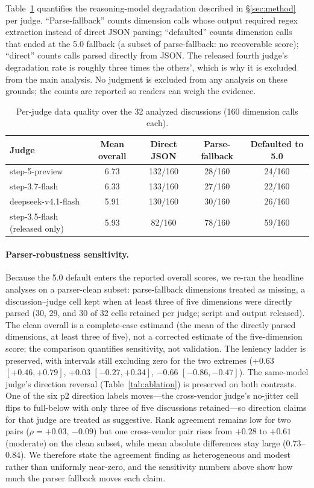 Table~\ref{tab:quality} quantifies the reasoning-model degradation
described in \S\ref{sec:method} per judge. ``Parse-fallback'' counts
dimension calls whose output required regex extraction instead of
direct JSON parsing; ``defaulted'' counts dimension calls that ended at
the 5.0 fallback (a subset of parse-fallback: no recoverable score);
``direct'' counts calls parsed directly from JSON. The released fourth
judge's degradation rate is roughly three times the others', which is
why it is excluded from the main analysis. No judgment is excluded from
any analysis on these grounds; the counts are reported so readers can
weigh the evidence.

\begin{table}[h]
\centering
\caption{Per-judge data quality over the 32 analyzed discussions
(160 dimension calls each).}
\label{tab:quality}
\small
\begin{tabular}{@{}lcccc@{}}
\toprule
Judge & Mean overall & Direct JSON & Parse-fallback & Defaulted to 5.0 \\
\midrule
step-5-preview & 6.73 & 132/160 & 28/160 & 24/160 \\
step-3.7-flash & 6.33 & 133/160 & 27/160 & 22/160 \\
deepseek-v4.1-flash & 5.91 & 130/160 & 30/160 & 26/160 \\
step-3.5-flash (released only) & 5.93 & 82/160 & 78/160 & 59/160 \\
\bottomrule
\end{tabular}
\end{table}

\paragraph{Parser-robustness sensitivity.}
Because the 5.0 default enters the reported overall scores, we re-ran
the headline analyses on a parser-clean subset: parse-fallback
dimensions treated as missing, a discussion--judge cell kept when at
least three of five dimensions were directly parsed (30, 29, and 30 of
32 cells retained per judge; script and output released). The clean
overall is a complete-case estimand (the mean of the directly parsed
dimensions, at least three of five), not a corrected estimate of the
five-dimension score; the comparison quantifies sensitivity, not
validation. The leniency ladder is preserved, with intervals still
excluding zero for the two
extremes ($+0.63$ $[+0.46,+0.79]$, $+0.03$ $[-0.27,+0.34]$, $-0.66$
$[-0.86,-0.47]$). The same-model judge's direction reversal
(Table~\ref{tab:ablation}) is preserved on both contrasts. One of the
six p2 direction labels moves---the cross-vendor judge's no-jitter cell
flips to full-below with only three of five discussions retained---so
direction claims for that judge are treated as suggestive. Rank
agreement remains low for two pairs ($\rho=+0.03$, $-0.09$) but one
cross-vendor pair rises from $+0.28$ to $+0.61$ (moderate) on the clean
subset, while mean absolute differences stay large (0.73--0.84). We
therefore state the agreement finding as heterogeneous and modest
rather than uniformly near-zero, and the sensitivity numbers above
show how much the parser fallback moves each claim.

